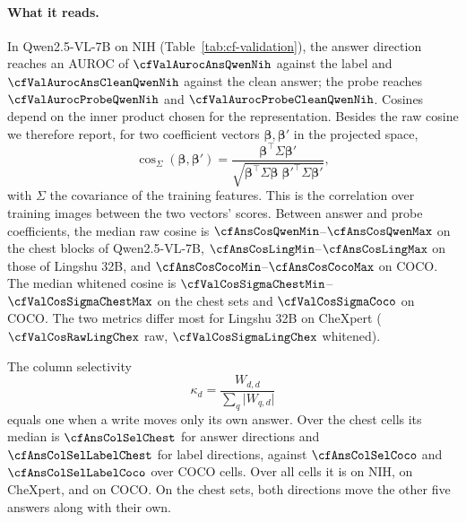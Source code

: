 \paragraph{What it reads.} In Qwen2.5-VL-7B on NIH (Table~\ref{tab:cf-validation}), the answer direction reaches an AUROC of $\cfValAurocAnsQwenNih$ against the label and $\cfValAurocAnsCleanQwenNih$ against the clean answer; the probe reaches $\cfValAurocProbeQwenNih$ and $\cfValAurocProbeCleanQwenNih$. Cosines depend on the inner product chosen for the representation\cite{park2024linear}. Besides the raw cosine we therefore report, for two coefficient vectors $\boldsymbol\beta,\boldsymbol\beta'$ in the projected space,
\begin{equation}
\cos_\Sigma(\boldsymbol\beta,\boldsymbol\beta')=\frac{\boldsymbol\beta^{\top}\Sigma\boldsymbol\beta'}{\sqrt{\boldsymbol\beta^{\top}\Sigma\boldsymbol\beta\;\boldsymbol\beta'^{\top}\Sigma\boldsymbol\beta'}},
\label{eq:whitened-cos}
\end{equation}
with $\Sigma$ the covariance of the training features. This is the correlation over training images between the two vectors' scores. Between answer and probe coefficients, the median raw cosine is $\cfAnsCosQwenMin$--$\cfAnsCosQwenMax$ on the chest blocks of Qwen2.5-VL-7B, $\cfAnsCosLingMin$--$\cfAnsCosLingMax$ on those of Lingshu 32B, and $\cfAnsCosCocoMin$--$\cfAnsCosCocoMax$ on COCO. The median whitened cosine is $\cfValCosSigmaChestMin$--$\cfValCosSigmaChestMax$ on the chest sets and $\cfValCosSigmaCoco$ on COCO. The two metrics differ most for Lingshu 32B on CheXpert ($\cfValCosRawLingChex$ raw, $\cfValCosSigmaLingChex$ whitened).

The column selectivity
\begin{equation}
\kappa_d=\frac{W_{d,d}}{\sum_q\lvert W_{q,d}\rvert}
\label{eq:column-selectivity}
\end{equation}
equals one when a write moves only its own answer. Over the \cfAnsColSelChestN{} chest cells its median is $\cfAnsColSelChest$ for answer directions and $\cfAnsColSelLabelChest$ for label directions, against $\cfAnsColSelCoco$ and $\cfAnsColSelLabelCoco$ over \cfAnsColSelCocoN{} COCO cells. Over all cells it is \cfValColSelNih{} on NIH, \cfValColSelChex{} on CheXpert, and \cfValColSelCoco{} on COCO. On the chest sets, both directions move the other five answers along with their own.




